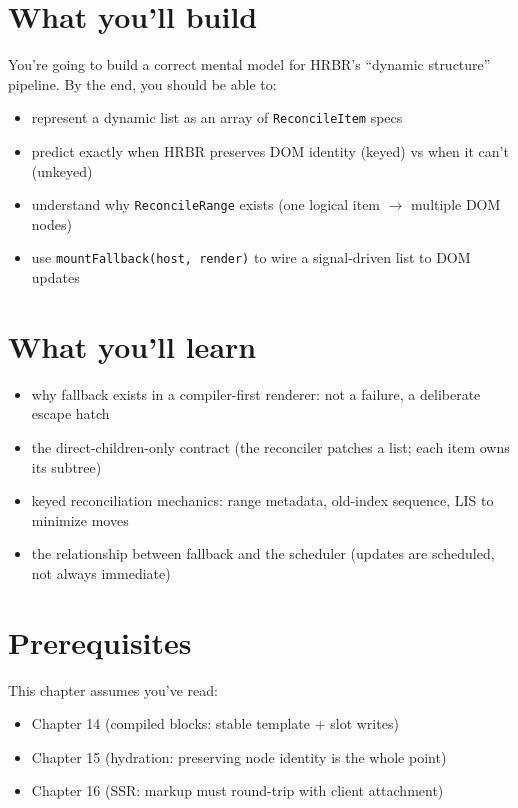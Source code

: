 \section{What you’ll build}

You’re going to build a correct mental model for HRBR’s “dynamic structure” pipeline.
By the end, you should be able to:

\begin{itemize}
  \item represent a dynamic list as an array of \texttt{ReconcileItem} specs
  \item predict exactly when HRBR preserves DOM identity (keyed) vs when it can’t (unkeyed)
  \item understand why \texttt{ReconcileRange} exists (one logical item $\rightarrow$ multiple DOM nodes)
  \item use \texttt{mountFallback(host, render)} to wire a signal-driven list to DOM updates
\end{itemize}

\section{What you’ll learn}

\begin{itemize}
  \item why fallback exists in a compiler-first renderer: not a failure, a deliberate escape hatch
  \item the direct-children-only contract (the reconciler patches a list; each item owns its subtree)
  \item keyed reconciliation mechanics: range metadata, old-index sequence, LIS to minimize moves
  \item the relationship between fallback and the scheduler (updates are scheduled, not always immediate)
\end{itemize}

\section{Prerequisites}

This chapter assumes you’ve read:

\begin{itemize}
  \item Chapter 14 (compiled blocks: stable template + slot writes)
  \item Chapter 15 (hydration: preserving node identity is the whole point)
  \item Chapter 16 (SSR: markup must round-trip with client attachment)
\end{itemize}

